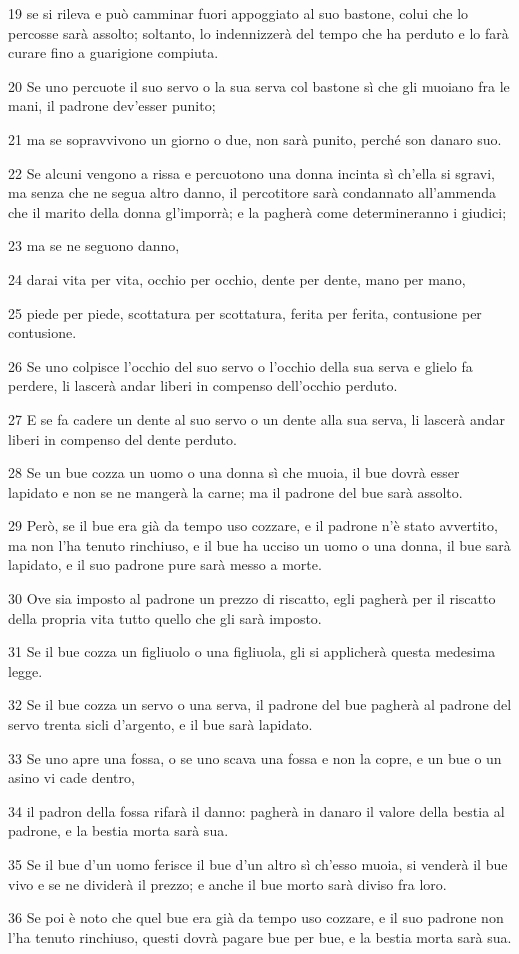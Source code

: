 \par 19 se si rileva e può camminar fuori appoggiato al suo bastone, colui che lo percosse sarà assolto; soltanto, lo indennizzerà del tempo che ha perduto e lo farà curare fino a guarigione compiuta.
\par 20 Se uno percuote il suo servo o la sua serva col bastone sì che gli muoiano fra le mani, il padrone dev'esser punito;
\par 21 ma se sopravvivono un giorno o due, non sarà punito, perché son danaro suo.
\par 22 Se alcuni vengono a rissa e percuotono una donna incinta sì ch'ella si sgravi, ma senza che ne segua altro danno, il percotitore sarà condannato all'ammenda che il marito della donna gl'imporrà; e la pagherà come determineranno i giudici;
\par 23 ma se ne seguono danno,
\par 24 darai vita per vita, occhio per occhio, dente per dente, mano per mano,
\par 25 piede per piede, scottatura per scottatura, ferita per ferita, contusione per contusione.
\par 26 Se uno colpisce l'occhio del suo servo o l'occhio della sua serva e glielo fa perdere, li lascerà andar liberi in compenso dell'occhio perduto.
\par 27 E se fa cadere un dente al suo servo o un dente alla sua serva, li lascerà andar liberi in compenso del dente perduto.
\par 28 Se un bue cozza un uomo o una donna sì che muoia, il bue dovrà esser lapidato e non se ne mangerà la carne; ma il padrone del bue sarà assolto.
\par 29 Però, se il bue era già da tempo uso cozzare, e il padrone n'è stato avvertito, ma non l'ha tenuto rinchiuso, e il bue ha ucciso un uomo o una donna, il bue sarà lapidato, e il suo padrone pure sarà messo a morte.
\par 30 Ove sia imposto al padrone un prezzo di riscatto, egli pagherà per il riscatto della propria vita tutto quello che gli sarà imposto.
\par 31 Se il bue cozza un figliuolo o una figliuola, gli si applicherà questa medesima legge.
\par 32 Se il bue cozza un servo o una serva, il padrone del bue pagherà al padrone del servo trenta sicli d'argento, e il bue sarà lapidato.
\par 33 Se uno apre una fossa, o se uno scava una fossa e non la copre, e un bue o un asino vi cade dentro,
\par 34 il padron della fossa rifarà il danno: pagherà in danaro il valore della bestia al padrone, e la bestia morta sarà sua.
\par 35 Se il bue d'un uomo ferisce il bue d'un altro sì ch'esso muoia, si venderà il bue vivo e se ne dividerà il prezzo; e anche il bue morto sarà diviso fra loro.
\par 36 Se poi è noto che quel bue era già da tempo uso cozzare, e il suo padrone non l'ha tenuto rinchiuso, questi dovrà pagare bue per bue, e la bestia morta sarà sua.

